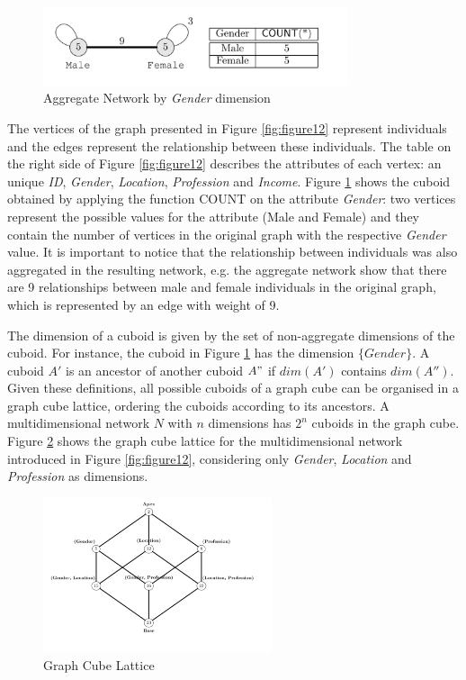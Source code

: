 \begin{figure}[ht]
\centering
\includegraphics[width=0.8\textwidth]{../aggregate_graph.png}
\caption{Aggregate Network by \emph{Gender} dimension \cite{Zhao2011}}
\label{fig:figure13}
\end{figure}

The vertices of the graph presented in Figure \ref{fig:figure12} represent individuals and the edges represent the relationship between these individuals. The table on the right side of Figure \ref{fig:figure12} describes the attributes of each vertex: an unique \emph{ID}, \emph{Gender}, \emph{Location}, \emph{Profession} and \emph{Income}. Figure \ref{fig:figure13} shows the cuboid obtained by applying the function COUNT on the attribute \emph{Gender}: two vertices represent the possible values for the attribute (Male and Female) and they contain the number of vertices in the original graph with the respective \emph{Gender} value. It is important to notice that the relationship between individuals was also aggregated in the resulting network, e.g. the aggregate network show that there are 9 relationships between male and female individuals in the original graph, which is represented by an edge with weight of 9.

The dimension of a cuboid is given by the set of non-aggregate dimensions of the cuboid. For instance, the cuboid in Figure \ref{fig:figure13} has the dimension $\{Gender\}$. A cuboid $A'$ is an ancestor of another cuboid $A"$ if $dim(A')$ contains $dim(A'')$. Given these definitions, all possible cuboids of a graph cube can be organised in a graph cube lattice, ordering the cuboids according to its ancestors. A multidimensional network $N$ with $n$ dimensions has $2^n$ cuboids in the graph cube. Figure \ref{fig:figure14} shows the graph cube lattice for the multidimensional network introduced in Figure \ref{fig:figure12}, considering only \emph{Gender}, \emph{Location} and \emph{Profession} as dimensions.

\begin{figure}[ht]
\centering
\includegraphics[width=0.6\textwidth]{../graph_lattice.png}
\caption{Graph Cube Lattice \cite{Zhao2011}}
\label{fig:figure14}
\end{figure}

